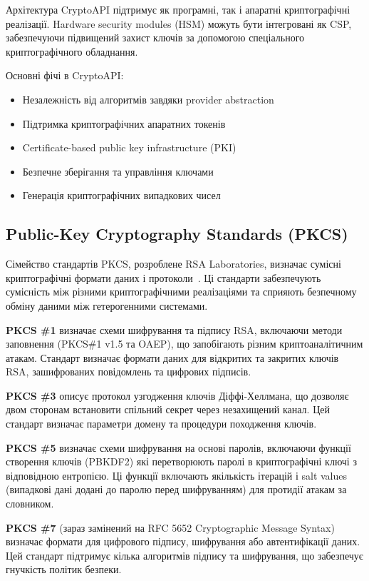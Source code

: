 Архітектура CryptoAPI підтримує як програмні, так і апаратні криптографічні реалізації. Hardware security modules 
(HSM) можуть бути інтегровані як CSP, забезпечуючи підвищений захист ключів за допомогою спеціального 
криптографічного обладнання.

Основні фічі в CryptoAPI:
\begin{itemize}
    \item Незалежність від алгоритмів завдяки provider abstraction 
    \item Підтримка криптографічних апаратних токенів
    \item Certificate-based public key infrastructure (PKI)
    \item Безпечне зберігання та управління ключами
    \item Генерація криптографічних випадкових чисел
\end{itemize}

\subsection{Public-Key Cryptography Standards (PKCS)}

Сімейство стандартів PKCS, розроблене RSA Laboratories, визначає сумісні криптографічні формати даних і протоколи~\cite{pkcs1}. 
Ці стандарти забезпечують сумісність між різними криптографічними реалізаціями та сприяють безпечному обміну даними 
між гетерогенними системами.

\textbf{PKCS \#1} визначає схеми шифрування та підпису RSA, включаючи методи заповнення (PKCS\#1 v1.5 та OAEP), що 
запобігають різним криптоаналітичним атакам. Стандарт визначає формати даних для відкритих та закритих ключів RSA, 
зашифрованих повідомлень та цифрових підписів.

\textbf{PKCS \#3} описує протокол узгодження ключів Діффі-Хеллмана, що дозволяє двом сторонам встановити спільний секрет 
через незахищений канал. Цей стандарт визначає параметри домену та процедури походження ключів.

\textbf{PKCS \#5} визначає схеми шифрування на основі паролів, включаючи функції створення ключів (PBKDF2) які 
перетворюють паролі в криптографічні ключі з відповідною ентропією. Ці функції включають якількість ітерацій і 
salt values (випадкові дані додані до паролю перед шифруванням) для протидії атакам за словником.

\textbf{PKCS \#7} (зараз замінений на RFC 5652 Cryptographic Message Syntax) визначає формати для цифрового підпису, 
шифрування або автентифікації даних. Цей стандарт підтримує кілька алгоритмів підпису та шифрування, що забезпечує 
гнучкість політик безпеки.

